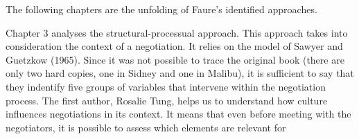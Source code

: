 ﻿\documentclass[../main.tex]{subfiles}
\begin{document}
The following chapters are the unfolding of Faure's identified approaches.

Chapter 3 analyses the structural-processual approach. This approach takes into consideration the context of a negotiation. It relies on the model of Sawyer and Guetzkow (1965). Since it was not possible to trace the original book (there are only two hard copies, one in Sidney and one in Malibu), it is sufficient to say that they indentify five groups of variables that intervene within the negotiation process.
The first author, Rosalie Tung, helps us to understand how culture influences negotiations in its context. It means that even before meeting with the negotiators, it is possible to assess which elements are relevant for 




\end{document}
